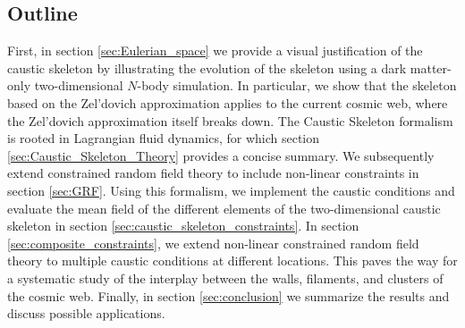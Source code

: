 \documentclass[a4paper, 11pt]{article}
\begin{document}
\subsection{Outline} 
First, in section \ref{sec:Eulerian_space} we provide a visual justification of the caustic skeleton by illustrating the evolution of the skeleton using a dark matter-only two-dimensional $N$-body simulation. In particular, we show that the skeleton based on the Zel'dovich approximation applies to the current cosmic web, where the Zel'dovich approximation itself breaks down. The Caustic Skeleton formalism is rooted in Lagrangian fluid dynamics, for which section \ref{sec:Caustic_Skeleton_Theory} provides a concise summary. We subsequently extend constrained random field theory to include non-linear constraints in section \ref{sec:GRF}. Using this formalism, we implement the caustic conditions and evaluate the mean field of the different elements of the two-dimensional caustic skeleton in section \ref{sec:caustic_skeleton_constraints}. In section \ref{sec:composite_constraints}, we extend non-linear constrained random field theory to multiple caustic conditions at different locations. This paves the way for a systematic study of the interplay between the walls, filaments, and clusters of the cosmic web. Finally, in section \ref{sec:conclusion} we summarize the results and discuss possible applications.
\end{document}
